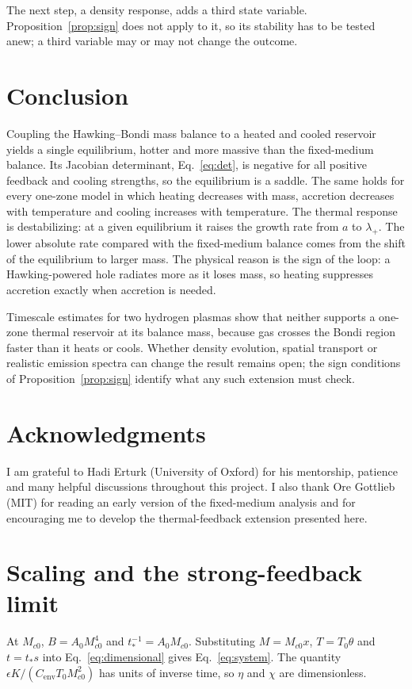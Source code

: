 \documentclass[11pt,a4paper]{article}
\newcommand{\Mc}{M_{c0}}
\newcommand{\tstar}{t_*}
\newcommand{\Cenv}{C_{\mathrm{env}}}
\begin{document}
The next step, a density response, adds a third state variable. Proposition~\ref{prop:sign} does not apply to it, so its stability has to be tested anew; a third variable may or may not change the outcome.

\section{Conclusion}
Coupling the Hawking--Bondi mass balance to a heated and cooled reservoir yields a single equilibrium, hotter and more massive than the fixed-medium balance. Its Jacobian determinant, Eq.~\eqref{eq:det}, is negative for all positive feedback and cooling strengths, so the equilibrium is a saddle. The same holds for every one-zone model in which heating decreases with mass, accretion decreases with temperature and cooling increases with temperature. The thermal response is destabilizing: at a given equilibrium it raises the growth rate from $a$ to $\lambda_+$. The lower absolute rate compared with the fixed-medium balance comes from the shift of the equilibrium to larger mass. The physical reason is the sign of the loop: a Hawking-powered hole radiates more as it loses mass, so heating suppresses accretion exactly when accretion is needed.

Timescale estimates for two hydrogen plasmas show that neither supports a one-zone thermal reservoir at its balance mass, because gas crosses the Bondi region faster than it heats or cools. Whether density evolution, spatial transport or realistic emission spectra can change the result remains open; the sign conditions of Proposition~\ref{prop:sign} identify what any such extension must check.

\section*{Acknowledgments}
I am grateful to Hadi Erturk (University of Oxford) for his mentorship, patience and many helpful discussions throughout this project. I also thank Ore Gottlieb (MIT) for reading an early version of the fixed-medium analysis and for encouraging me to develop the thermal-feedback extension presented here.

\appendix
\section{Scaling and the strong-feedback limit}\label{app:scaling}
At $\Mc$, $B=A_0\Mc^4$ and $\tstar^{-1}=A_0\Mc$. Substituting $M=\Mc x$, $T=T_0\theta$ and $t=\tstar s$ into Eq.~\eqref{eq:dimensional} gives Eq.~\eqref{eq:system}. The quantity $\epsilon K/(\Cenv T_0\Mc^2)$ has units of inverse time, so $\eta$ and $\chi$ are dimensionless.
\end{document}
